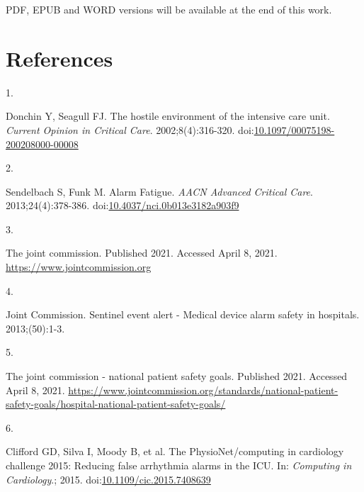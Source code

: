 \documentclass[12pt,twoside]{reedthesis}
\newlength{\csllabelwidth}
\newlength{\cslhangindent}
\newenvironment{CSLReferences}[2] %
 {%
  \setlength{\parindent}{0pt}
  \ifodd #1 \everypar{\setlength{\hangindent}{\cslhangindent}}\ignorespaces\fi
  \ifnum #2 > 0
  \setlength{\parskip}{#2\baselineskip}
  \fi
 }%
 {}
\newcommand{\CSLLeftMargin}[1]{\parbox[t]{\csllabelwidth}{#1}}
\newcommand{\CSLRightInline}[1]{\parbox[t]{\linewidth - \csllabelwidth}{#1}}
\begin{document}
PDF, EPUB and WORD versions will be available at the end of this work.

\backmatter

\hypertarget{references}{%
\chapter*{References}\label{references}}


\noindent

\setlength{\parindent}{-0.20in}
\setlength{\leftskip}{0.20in}
\setlength{\parskip}{8pt}

\hypertarget{refs}{}
\begin{CSLReferences}{0}{0}
\leavevmode{}%
\CSLLeftMargin{1. }
\CSLRightInline{Donchin Y, Seagull FJ. The hostile environment of the intensive care unit. \emph{Current Opinion in Critical Care}. 2002;8(4):316-320. doi:\href{https://doi.org/10.1097/00075198-200208000-00008}{10.1097/00075198-200208000-00008}}

\leavevmode{}%
\CSLLeftMargin{2. }
\CSLRightInline{Sendelbach S, Funk M. Alarm Fatigue. \emph{AACN Advanced Critical Care}. 2013;24(4):378-386. doi:\href{https://doi.org/10.4037/nci.0b013e3182a903f9}{10.4037/nci.0b013e3182a903f9}}

\leavevmode{}%
\CSLLeftMargin{3. }
\CSLRightInline{The joint commission. Published 2021. Accessed April 8, 2021. \url{https://www.jointcommission.org}}

\leavevmode{}%
\CSLLeftMargin{4. }
\CSLRightInline{Joint Commission. {Sentinel event alert - Medical device alarm safety in hospitals.} 2013;(50):1-3.}

\leavevmode{}%
\CSLLeftMargin{5. }
\CSLRightInline{The joint commission - national patient safety goals. Published 2021. Accessed April 8, 2021. \url{https://www.jointcommission.org/standards/national-patient-safety-goals/hospital-national-patient-safety-goals/}}

\leavevmode{}%
\CSLLeftMargin{6. }
\CSLRightInline{Clifford GD, Silva I, Moody B, et al. The PhysioNet/computing in cardiology challenge 2015: Reducing false arrhythmia alarms in the ICU. In: \emph{Computing in Cardiology}.; 2015. doi:\href{https://doi.org/10.1109/cic.2015.7408639}{10.1109/cic.2015.7408639}}


\end{CSLReferences}
\end{document}
